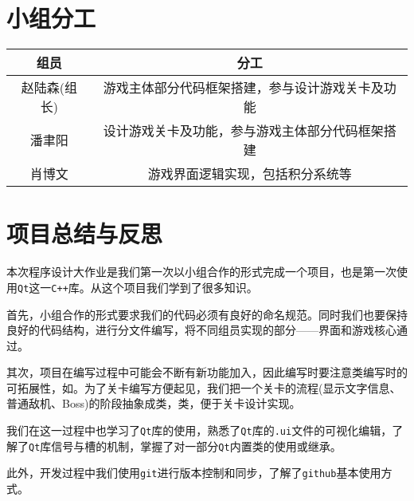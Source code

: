 \documentclass[UTF8,12pt]{ctexart}
\begin{document}
    \section{小组分工}
	    \begin{table}[h]
	        \centering
	        \begin{tabular}{cc}
	            \toprule
	            组员      & 分工                       \\
	            \midrule
	            赵陆森(组长) & 游戏主体部分代码框架搭建，参与设计游戏关卡及功能 \\
	            潘聿阳     & 设计游戏关卡及功能，参与游戏主体部分代码框架搭建 \\
	            肖博文     & 游戏界面逻辑实现，包括积分系统等         \\
	            \bottomrule
	        \end{tabular}
	    \end{table}

    \section{项目总结与反思}
	    本次程序设计大作业是我们第一次以小组合作的形式完成一个项目，也是第一次使用\texttt{Qt}这一\texttt{C++}库。从这个项目我们学到了很多知识。

	    首先，小组合作的形式要求我们的代码必须有良好的命名规范。同时我们也要保持良好的代码结构，进行分文件编写，将不同组员实现的部分——界面和游戏核心通过。

	    其次，项目在编写过程中可能会不断有新功能加入，因此编写时要注意类编写时的可拓展性，如。为了关卡编写方便起见，我们把一个关卡的流程(显示文字信息、普通敌机、Boss)的阶段抽象成类，类，便于关卡设计实现。

	    我们在这一过程中也学习了\texttt{Qt}库的使用，熟悉了\texttt{Qt}库的\texttt{.ui}文件的可视化编辑，了解了\texttt{Qt}库信号与槽的机制，掌握了对一部分\texttt{Qt}内置类的使用或继承。

	    此外，开发过程中我们使用\texttt{git}进行版本控制和同步，了解了\texttt{github}基本使用方式。
\end{document}

